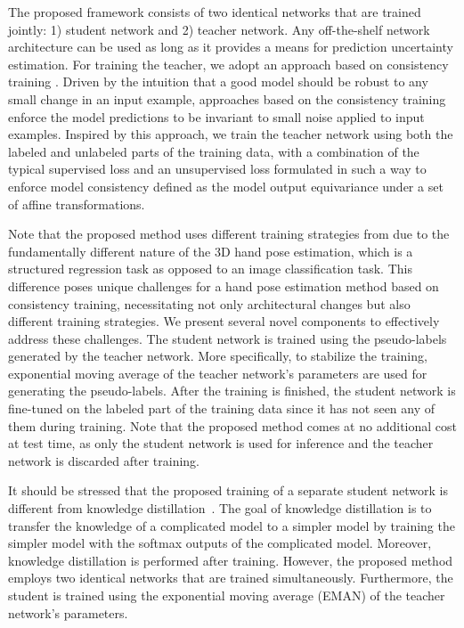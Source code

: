 \documentclass{article}
\begin{document}
\par
The proposed framework consists of two identical networks that are trained jointly: 1) student network and 2) teacher network. Any off-the-shelf network architecture can be used as long as it provides a means for prediction uncertainty estimation. For training the teacher, we adopt an approach based on consistency training \cite{xie2019unsupervised}. Driven by the intuition that a good model should be robust to any small change in an input example, approaches based on the consistency training enforce the model predictions to be invariant to small noise applied to input examples. Inspired by this approach, we train the teacher network using both the labeled and unlabeled parts of the training data, with a combination of the typical supervised loss and an unsupervised loss formulated in such a way to enforce model consistency defined as the model output equivariance under a set of affine transformations. 
\par
Note that the proposed method uses different training strategies from \cite{xie2019unsupervised} due to the fundamentally different nature of the 3D hand pose estimation, which is a structured regression task as opposed to an image classification task. This difference poses unique challenges for a hand pose estimation method based on consistency training, necessitating not only architectural changes but also different training strategies. We present several novel components to effectively address these challenges. The student network is trained using the pseudo-labels generated by the teacher network. More specifically, to stabilize the training, exponential moving average \cite{cai2021exponential} of the teacher network's parameters are used for generating the pseudo-labels. After the training is finished, the student network is fine-tuned on the labeled part of the training data since it has not seen any of them during training. Note that the proposed method comes at no additional cost at test time, as only the student network is used for inference and the teacher network is discarded after training.
\par
 It should be stressed that the proposed training of a separate student network is different from knowledge distillation~\cite{hinton2015distilling}. The goal of knowledge distillation is to transfer the knowledge of a complicated model to a simpler model by training the simpler model with the softmax outputs of the complicated model. Moreover, knowledge distillation is performed after training. However, the proposed method employs two identical networks that are trained simultaneously. Furthermore, the student is trained using the exponential moving average (EMAN) of the teacher network's parameters. 
\end{document}
